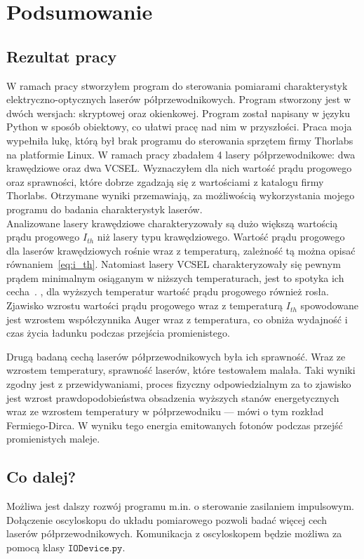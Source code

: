 \chapter{Podsumowanie}
\section{Rezultat pracy}
W ramach pracy stworzyłem program do sterowania pomiarami charakterystyk elektryczno-optycznych laserów półprzewodnikowych.
Program stworzony jest
w dwóch wersjach: skryptowej oraz okienkowej. Program został napisany w języku Python w sposób obiektowy, co ułatwi
pracę nad nim w przyszłości. Praca moja wypełniła lukę, którą był brak programu do sterowania sprzętem firmy Thorlabs
na platformie Linux. W ramach pracy zbadałem 4 lasery półprzewodnikowe: dwa krawędziowe oraz dwa VCSEL. Wyznaczyłem dla nich
wartość prądu progowego oraz sprawności, które dobrze zgadzają się z wartościami z katalogu firmy Thorlabs. Otrzymane wyniki
przemawiają, za możliwością wykorzystania mojego programu do badania charakterystyk laserów. \\

Analizowane lasery krawędziowe charakteryzowały są dużo większą wartością prądu progowego $I_{th}$ niż lasery typu krawędziowego.
Wartość prądu progowego dla laserów krawędziowych rośnie wraz z temperaturą, zależność tą można opisać równaniem~\ref{eq:i_th}.
Natomiast lasery VCSEL charakteryzowały się pewnym prądem minimalnym osiąganym w niższych temperaturach, jest to spotyka ich cecha~\cite{publikacja_1}.
, dla wyższych temperatur wartość prądu progowego również rosła. Zjawisko wzrostu wartości prądu progowego wraz z temperaturą $I_{th}$
spowodowane jest wzrostem współczynnika Auger wraz z temperatura, co obniża wydajność i czas życia ładunku podczas przejścia promienistego.

Drugą badaną cechą laserów półprzewodnikowych była ich sprawność. Wraz ze wzrostem temperatury, sprawność laserów, które testowałem malała.
Taki wyniki zgodny jest z przewidywaniami, proces fizyczny odpowiedzialnym za to zjawisko jest wzrost prawdopodobieństwa obsadzenia
wyższych stanów energetycznych wraz ze wzrostem temperatury w półprzewodniku --- mówi o tym rozkład Fermiego-Dirca.
W wyniku tego energia emitowanych fotonów podczas przejść promienistych maleje.
\section{Co dalej?}
Możliwa jest dalszy rozwój programu m.in. o sterowanie zasilaniem impulsowym. Dołączenie oscyloskopu do układu pomiarowego pozwoli badać więcej cech
laserów półprzewodnikowych. Komunikacja z oscyloskopem będzie możliwa za pomocą klasy $\mathtt{IODevice.py}$.


